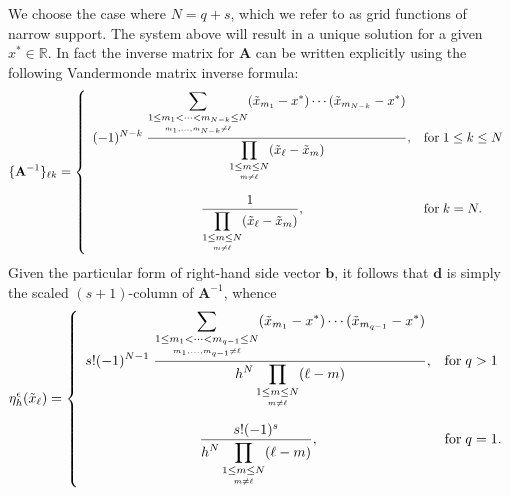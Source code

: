 We choose the case where $N=q+s$, which we refer to as grid functions of narrow support.
The system above will result in a unique solution for a given $x^*\in\mathbb R$.
In fact the inverse matrix for $\mathbf A$ can be written explicitly using the following Vandermonde matrix inverse formula:
\begin{equation*}\label{eq:vandinv}
	\{\mathbf A^{-1} \}_{\ell k} = \left\{ \begin{array}{cl}
		\displaystyle
		(-1)^{N-k} \; 
		\frac{
			\displaystyle
			\sum_{\underset{m_1,...,m_{N-k}\neq \ell}{1\le m_1<\cdots<m_{N-k}\le N}}
			 (\tilde x_{m_1}-x^*) \cdots (\tilde x_{m_{N-k}}-x^*)
		}
		{
			\displaystyle
			\prod_{\underset{m\neq \ell}{1\le m\le N}} (\tilde x_\ell - \tilde x_m)
		}
		,& \text{for} \; 1\le k\le N  \vspace{10pt} \\ 
		\displaystyle
		\frac{
			1
		}
		{
			\displaystyle
			\prod_{\underset{m\neq \ell}{1\le m\le N}} (\tilde x_\ell - \tilde x_m)
		}
		,& \text{for}\; k=N.
	\end{array}\right.
\end{equation*}
Given the particular form of right-hand side vector $\mathbf b$, it follows that $\mathbf d$ is simply the scaled $(s+1)$-column of $\mathbf A^{-1}$, whence
\begin{equation}\label{eq:gridfunsol}
	\eta_h^\epsilon(\tilde x_\ell) = \left\{ \begin{array}{cl}
		\displaystyle
		s! (-1)^{N-1} \; 
		\frac{
			\displaystyle
			\sum_{\underset{m_1,...,m_{q-1}\neq \ell}{1\le m_1<\cdots<m_{q-1}\le N}}
			 (\tilde x_{m_1}-x^*) \cdots (\tilde x_{m_{q-1}}-x^*)
		}
		{
			\displaystyle
			h^{N} \prod_{\underset{m\neq \ell}{1\le m\le N}} (\ell - m)
		}
		,& \text{for} \; q>1  \vspace{10pt} \\ 
		\displaystyle
		\frac{
			s!(-1)^{s}
		}
		{
			\displaystyle
			h^N \prod_{\underset{m\neq \ell}{1\le m\le N}} (\ell - m)
		}
		,& \text{for}\; q=1.
	\end{array}\right.
\end{equation}

